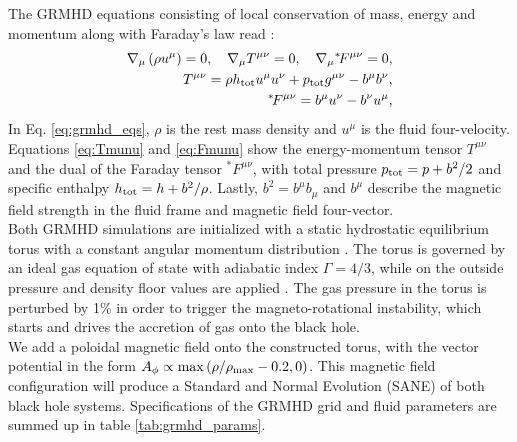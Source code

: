 \documentclass[a4paper,11pt]{article}
\begin{document}
The GRMHD equations consisting of local conservation of mass, energy and momentum along with Faraday's law read \cite{Rezzolla_book:2013,Porth2017}:
\begin{align} 
\nabla_\mu\left(\rho u^\mu\right)=0,\ \ \ \nabla_\mu T^{\mu\nu}=0,\ \ \ \nabla_\mu {}^{*}\!F^{\mu\nu}=0,\label{eq:grmhd_eqs}\\
T^{\mu\nu}=\rho h_{\rm tot}u^\mu u^\nu +p_{\rm tot} g^{\mu\nu}-b^\mu b^\nu,\label{eq:Tmunu}\\
 ^{*}\!F^{\mu\nu}=b^\mu u^\nu - b^\nu u^\mu,\label{eq:Fmunu}
\end{align}
In Eq. \ref{eq:grmhd_eqs}, $\rho$ is the rest mass density and $u^\mu$ is the fluid four-velocity. Equations \ref{eq:Tmunu} and \ref{eq:Fmunu} show the energy-momentum tensor $T^{\mu\nu}$ and the dual of the Faraday tensor $^{*}\!F^{\mu\nu}$, with total pressure $p_{\rm tot}=p+b^2/2$ and specific enthalpy $h_{\rm tot}=h+b^2/\rho$. Lastly, $b^2=b^\mu b_\mu$ and $b^\mu$ describe the magnetic field strength in the fluid frame and magnetic field four-vector. \\ 
Both GRMHD simulations are initialized with a static hydrostatic equilibrium torus with a constant angular momentum distribution \cite{Font02b,Rezzolla_book:2013}. The torus is governed by an ideal gas equation of state with adiabatic index $\Gamma=4/3$, while on the outside pressure and density floor values are applied \cite{Mizuno2018}. The gas pressure in the torus is perturbed by 1\% in order to trigger the magneto-rotational instability, which starts and drives the accretion of gas onto the black hole. \\
We add a poloidal magnetic field onto the constructed torus, with the vector potential in the form $A_\phi \propto \max\left(\rho/\rho_{\rm max}-0.2,0\right)$.
This magnetic field configuration will produce a Standard and Normal Evolution (SANE) \cite{Narayan2012,Mizuno2018,Ripperda2020} of both black hole systems. Specifications of the GRMHD grid and fluid parameters are summed up in table \ref{tab:grmhd_params}.
\end{document}
